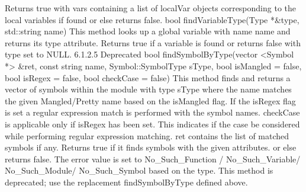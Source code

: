 Returns true with vars containing a list of localVar objects corresponding to the local variables if found or else returns false.
bool findVariableType(Type *&type, std::string name)
This method looks up a global variable with name name and returns its type attribute.
Returns true if a variable is found or returns false with type set to NULL.
6.1.2.5 Deprecated
bool findSymbolByType(vector <Symbol *> &ret, const string name,
    Symbol::SymbolType sType, bool isMangled = false,
    bool isRegex = false, bool checkCase = false)
This method finds and returns a vector of symbols within the module with type sType where the name matches the given Mangled/Pretty name based on the isMangled flag. If the isRegex flag is set a regular expression match is performed with the symbol names. checkCase is applicable only if isRegex has been set. This indicates if the case be considered while performing regular expression matching. ret contains the list of matched symbols if any.
Returns true if it finds symbols with the given attributes. or else returns false. The error value is set to No_Such_Function / No_Such_Variable/ No_Such_Module/ No_Such_Symbol based on the type.
This method is deprecated; use the replacement findSymbolByType defined above.

